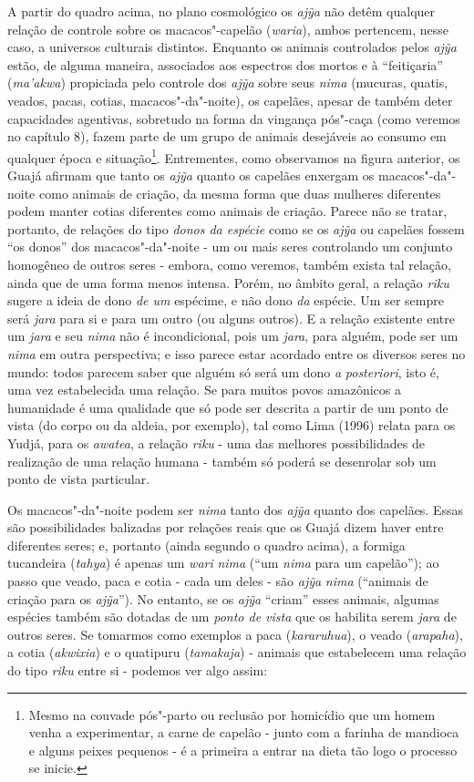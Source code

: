 A partir do quadro acima, no plano cosmológico os \emph{ajỹa} não detêm
qualquer relação de controle sobre os macacos"-capelão (\emph{waria}),
ambos pertencem, nesse caso, a universos culturais distintos. Enquanto
os animais controlados pelos \emph{ajỹa} estão, de alguma maneira,
associados aos espectros dos mortos e à ``feitiçaria'' (\emph{ma'akwa})
propiciada pelo controle dos \emph{ajỹa} sobre seus \emph{nima}
(mucuras, quatis, veados, pacas, cotias, macacos"-da"-noite), os capelães,
apesar de também deter capacidades agentivas, sobretudo na forma da
vingança pós"-caça (como veremos no capítulo 8), fazem parte de um grupo
de animais desejáveis ao consumo em qualquer época e situação\footnote{Mesmo
  na couvade pós"-parto ou reclusão por homicídio que um homem venha a
  experimentar, a carne de capelão - junto com a farinha de mandioca e
  alguns peixes pequenos - é a primeira a entrar na dieta tão logo o
  processo se inicie.}. Entrementes, como observamos na figura anterior,
os Guajá afirmam que tanto os \emph{ajỹa} quanto os capelães enxergam os
macacos"-da"-noite como animais de criação, da mesma forma que duas
mulheres diferentes podem manter cotias diferentes como animais de
criação. Parece não se tratar, portanto, de relações do tipo \emph{donos
da espécie} como se os \emph{ajỹa} ou capelães fossem ``os donos'' dos
macacos"-da"-noite - um ou mais seres controlando um conjunto homogêneo de
outros seres - embora, como veremos, também exista tal relação, ainda
que de uma forma menos intensa. Porém, no âmbito geral, a relação
\emph{riku} sugere a ideia de dono \emph{de um} espécime, e não dono
\emph{da} espécie. Um ser sempre será \emph{jara} para si e para um
outro (ou alguns outros). E a relação existente entre um \emph{jara} e
seu \emph{nima} não é incondicional, pois um \emph{jara}, para alguém,
pode ser um \emph{nima} em outra perspectiva; e isso parece estar
acordado entre os diversos seres no mundo: todos parecem saber que
alguém só será um dono \emph{a} \emph{posteriori}, isto é, uma vez
estabelecida uma relação. Se para muitos povos amazônicos a humanidade é
uma qualidade que só pode ser descrita a partir de um ponto de vista (do
corpo ou da aldeia, por exemplo), tal como Lima (1996) relata para os
Yudjá, para os \emph{awatea}, a relação \emph{riku} - uma das melhores
possibilidades de realização de uma relação humana - também só poderá se
desenrolar sob um ponto de vista particular.

Os macacos"-da"-noite podem ser \emph{nima} tanto dos \emph{ajỹa} quanto
dos capelães. Essas são possibilidades balizadas por relações reais que
os Guajá dizem haver entre diferentes seres; e, portanto (ainda segundo
o quadro acima), a formiga tucandeira (\emph{tahya}) é apenas um
\emph{wari} \emph{nima} (``um \emph{nima} para um capelão''); ao passo que
veado, paca e cotia - cada um deles - são \emph{ajỹa} \emph{nima}
(``animais de criação para os \emph{ajỹa}''). No entanto, se os
\emph{ajỹa} ``criam'' esses animais, algumas espécies também são dotadas
de um \emph{ponto de vista} que os habilita serem \emph{jara} de outros
seres. Se tomarmos como exemplos a paca (\emph{kararuhua}), o veado
(\emph{arapaha}), a cotia (\emph{akwixia}) e o quatipuru
(\emph{tamakaja}) - animais que estabelecem uma relação do tipo
\emph{riku} entre si - podemos ver algo assim:

